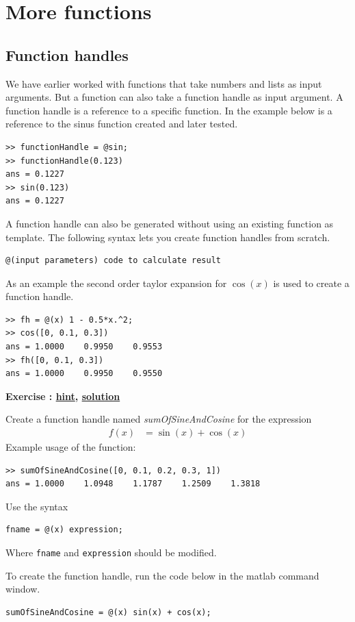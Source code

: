 \documentclass[12pt,a4paper]{article}
\makeatletter
\newcommand{\linkdest}[1]{\Hy@raisedlink{\hypertarget{#1}{}}}
\newcounter{ex}
\numberwithin{ex}{section}
\newenvironment{ex}[1][]{%
\filbreak
\bigskip
\refstepcounter{ex}
\noindent
\textbf{\linkdest{\theex{}exercise}{}Exercise \theex{}: #1\hfill\hyperlink{\theex{}hint}{hint}, \hyperlink{\theex{}solution}{solution}}\par\noindent}{}
\makeatother
\begin{document}


\newpage
\section{More functions}




\subsection{Function handles}

We have earlier worked with functions that take numbers and lists 
as input arguments.
But a function can also take a function handle as input argument.
A function handle is a reference to a specific function. 
In the example below is a reference to the sinus function created 
and later tested.
%
\begin{lstlisting}
>> functionHandle = @sin;
>> functionHandle(0.123)
ans = 0.1227
>> sin(0.123)
ans = 0.1227
\end{lstlisting}
%
A function handle can also be generated without using an existing function as template.
The following syntax lets you create function handles from scratch.
%
\begin{lstlisting}
@(input parameters) code to calculate result
\end{lstlisting}
%
As an example the second order taylor expansion for $\cos(x)$ is used to create 
a function handle.
\begin{lstlisting}
>> fh = @(x) 1 - 0.5*x.^2;
>> cos([0, 0.1, 0.3])
ans = 1.0000    0.9950    0.9553
>> fh([0, 0.1, 0.3])
ans = 1.0000    0.9950    0.9550
\end{lstlisting}

\begin{ex}
Create a function handle named \emph{sumOfSineAndCosine} for the expression
\begin{align*}
f(x) & = \sin(x) + \cos(x)
\end{align*}
Example usage of the function:
\begin{lstlisting}
>> sumOfSineAndCosine([0, 0.1, 0.2, 0.3, 1])
ans = 1.0000    1.0948    1.1787    1.2509    1.3818
\end{lstlisting}
\begin{hint}
Use the syntax
\begin{lstlisting}
fname = @(x) expression;
\end{lstlisting}
Where \verb!fname! and \verb!expression! should be modified.
\end{hint}
\begin{sol}
To create the function handle, run the code below in the matlab command window.
\begin{lstlisting}
sumOfSineAndCosine = @(x) sin(x) + cos(x);
\end{lstlisting}
\end{sol}
\end{ex}
\end{document}
